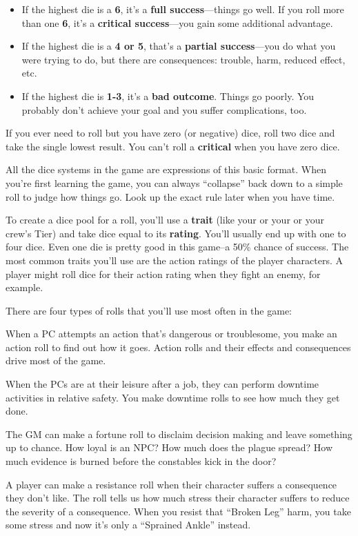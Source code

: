 \begin{itemize}
\item If the highest die is a \textbf{6}, it’s a \textbf{full success}—things go well. If you roll more than one \textbf{6}, it’s a \textbf{critical success}—you gain some additional advantage.
\item If the highest die is a \textbf{4 or 5}, that’s a \textbf{partial success}—you do what you were trying to do, but there are consequences: trouble, harm, reduced effect, etc.
\item If the highest die is \textbf{1-3}, it’s a \textbf{bad outcome}. Things go poorly. You probably don’t achieve your goal and you suffer complications, too.
\end{itemize}

\begin{qb}
If you ever need to roll but you have zero (or negative) dice, roll two dice and take the single lowest result. You can’t roll a \textbf{critical} when you have zero dice.
\end{qb}

All the dice systems in the game are expressions of this basic format. When you’re first learning the game, you can always ``collapse'' back down to a simple roll to judge how things go. Look up the exact rule later when you have time.

To create a dice pool for a roll, you’ll use a \textbf{trait} (like your  or your  or your crew’s Tier) and take dice equal to its \textbf{rating}. You’ll usually end up with one to four dice. Even one die is pretty good in this game--a 50\% chance of success. The most common traits you’ll use are the action ratings of the player characters. A player might roll dice for their  action rating when they fight an enemy, for example.

There are four types of rolls that you’ll use most often in the game:

\begin{description}[font=\rmfamily\bfseries\scshape, leftmargin=1cm]
\item[Action roll] When a PC attempts an action that’s dangerous or troublesome, you make an action roll to find out how it goes. Action rolls and their effects and consequences drive most of the game.
\item[Downtime roll] When the PCs are at their leisure after a job, they can perform downtime activities in relative safety. You make downtime rolls to see how much they get done.
\item[Fortune roll] The GM can make a fortune roll to disclaim decision making and leave something up to chance. How loyal is an NPC? How much does the plague spread? How much evidence is burned before the constables kick in the door?
\item[Resistance roll] A player can make a resistance roll when their character suffers a consequence they don’t like. The roll tells us how much stress their character suffers to reduce the severity of a consequence. When you resist that ``Broken Leg'' harm, you take some stress and now it’s only a ``Sprained Ankle'' instead.
\end{description}

